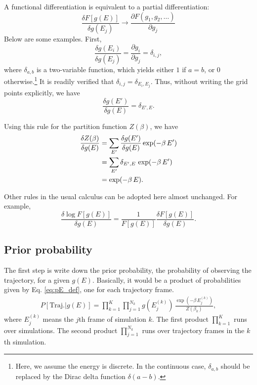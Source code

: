 \documentclass[aip,jcp,preprint,superscriptaddress]{revtex4-1}
\begin{document}
A functional differentiation is
equivalent to a partial differentiation:
%
\begin{equation}
\frac{ \delta F[g(E)]}
     { \delta g(E_j) }
\rightarrow
\frac{ \partial F(g_1, g_2, \dots) }
     { \partial g_j }
\end{equation}
%
Below are some examples.
%
First,
%
\begin{equation}
\frac{ \delta g(E_i) }
     { \delta g(E_j) }
=
\frac{ \partial g_i }
     { \partial g_j }
=
\delta_{i, j},
\end{equation}
%
where $\delta_{a, b}$
is a two-variable function,
which yields either $1$ if $a = b$,
or $0$ otherwise.\footnote{
%
Here, we assume the energy is discrete.
In the continuous case,
$\delta_{a, b}$
should be replaced by the Dirac delta function
$\delta(a - b)$.
%
}
%
It is readily verified that
$\delta_{i, j} = \delta_{E_i, E_j}$.
%
Thus,
without writing the grid points explicitly, we have
\begin{equation}
\frac{ \delta g(E') }
     { \delta g(E) }
=
\delta_{E', E}.
\label{eq:funcdiff_g}
\end{equation}



Using this rule for the partition function $Z(\beta)$,
we have
\begin{align}
\frac{ \delta Z(\beta) }
     { \delta g(E) }
&=
\sum_{E'}
\frac{ \delta g(E') }
     { \delta g(E) }
\exp(-\beta \, E')
\notag \\
&=
\sum_{E'} \delta_{E', E} \, \exp(-\beta \, E')
\notag \\
&= \exp(-\beta \, E).
\label{eq:funcdiff_Z}
\end{align}




Other rules in the usual calculus
can be adopted here almost unchanged.
%
For example,
\begin{equation}
\frac{ \delta \log F[g(E)] }
     { \delta g(E) }
=
\frac{ 1 } { F[g(E)] }
\frac{ \delta F[g(E)] }
     { \delta g(E) }.
\label{eq:funcdiff_logF}
\end{equation}




\subsection{Prior probability}



The first step is write down the prior probability,
the probability of observing the trajectory,
for a given $g(E)$.
%
Basically,
it would be a product of
probabilities given by Eq. \eqref{eq:pE_def},
one for each trajectory frame.
%
\begin{align}
P[\mathrm{Traj.}|g(E)]
=
\prod_{k = 1}^K
\prod_{j = 1}^{N_k}
g(E^{(k)}_j) \, \frac{ \exp(-\beta \, E^{(k)}_j) } { Z(\beta_k) },
\label{eq:Pg_prior}
\end{align}
%
where
$E^{(k)}_j$
means the $j$th frame of simulation $k$.
%
The first product $\prod_{k=1}^K$
runs over simulations.
%
The second product $\prod_{j=1}^{N_k}$
runs over trajectory frames in the $k$th simulation.
\end{document}
